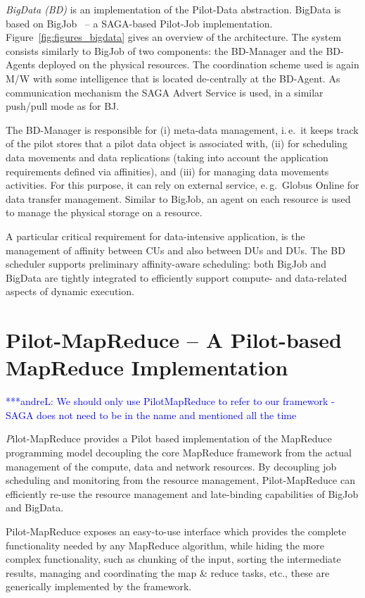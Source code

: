 \documentclass{acm_proc_article-sp}
\newcommand{\alnote}[1]{ {\textcolor{blue} { ***andreL: #1 }}}
\newcommand{\alnote}[1]{}
\newcommand{\pilot}{Pilot\xspace}
\newcommand{\pilotmapreduce}{Pilot-MapReduce\xspace}
\begin{document}
{\it BigData (BD)} is an implementation of the Pilot-Data abstraction.
BigData is based on BigJob~\cite{bigjob_web} -- a SAGA-based Pilot-Job
implementation. Figure~\ref{fig:figures_bigdata} gives an overview of the
architecture. The system consists similarly to BigJob of two components: the
BD-Manager and the BD-Agents deployed on the physical resources. The
coordination scheme used is again M/W with some intelligence that is located
de-centrally at the BD-Agent. As communication mechanism the SAGA Advert
Service is used, in a similar push/pull mode as for BJ.

The BD-Manager is responsible for (i) meta-data management, i.\,e.\ it
keeps track of the pilot stores that a pilot data object is associated
with, (ii) for scheduling data movements and data replications (taking
into account the application requirements defined via affinities), and
(iii) for managing data movements activities. For this purpose, it can rely
on external service, e.\,g.\ Globus Online for data transfer management.  
Similar to BigJob, an agent on each resource is used to manage the physical 
storage on a resource.  

A particular critical requirement for data-intensive application, is
the management of affinity between CUs and also between DUs and
DUs. The BD scheduler supports preliminary affinity-aware
scheduling: both BigJob and BigData are tightly integrated to
efficiently support compute- and data-related aspects of dynamic
execution.


\section{Pilot-MapReduce -- A Pilot-based MapReduce Implementation}
\alnote{We should only use PilotMapReduce to refer to our framework - SAGA does not need to be in the name and mentioned all the time}


{\emph \pilotmapreduce} provides a \pilot based implementation of the 
MapReduce programming model decoupling the core MapReduce framework from the 
actual management of the compute, data and network resources. By decoupling 
job scheduling and monitoring from the resource management, \pilotmapreduce 
can efficiently re-use the resource management and late-binding capabilities 
of BigJob and BigData.

\pilotmapreduce exposes an easy-to-use interface which provides the complete
functionality needed by any MapReduce algorithm, while hiding the more complex
functionality, such as chunking of the input, sorting the intermediate
results, managing and coordinating the map \& reduce tasks, etc., these are generically
implemented by the framework.
\end{document}

